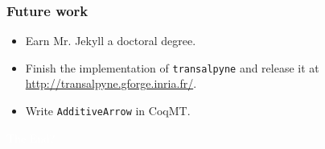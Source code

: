 \documentclass[10pt]{beamer}
\newcommand{\tALpy}{\texttt{transalpyne}}
\begin{document}

\begin{frame}
  \frametitle{Future work}

  \begin{itemize}
  \item Earn Mr. Jekyll a doctoral degree.
  \item Finish the implementation of \tALpy{} and release it at
    \url{http://transalpyne.gforge.inria.fr/}.
  \item Write \lstinline{AdditiveArrow} in CoqMT.
  \end{itemize}
\end{frame}



{
  \begin{frame}[plain]
    \vspace{8cm}
    \begin{center}
      \textcolor{white}{\Huge The End?}
    \end{center}
  \end{frame}
}

\end{document}
